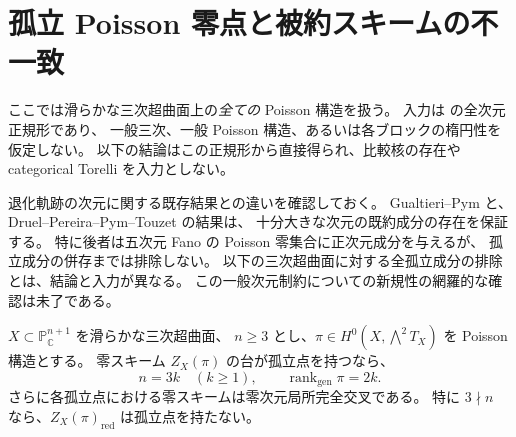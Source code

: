 \section{孤立 Poisson 零点と被約スキームの不一致}
\label{mix:sec:poisson-limits}

ここでは滑らかな三次超曲面上の\emph{全ての} Poisson 構造を扱う。
入力は \cite[定理\texttt{thm:pg-normal}]{NCCubicA} の全次元正規形であり、
一般三次、一般 Poisson 構造、あるいは各ブロックの楕円性を仮定しない。
以下の結論はこの正規形から直接得られ、比較核の存在や
categorical Torelli を入力としない。

退化軌跡の次元に関する既存結果との違いを確認しておく。
Gualtieri--Pym
\cite[Conjecture~1.1, Theorem~7.13]{GualtieriPymDegeneracy}と、
Druel--Pereira--Pym--Touzet
\cite[Theorem~1.2, Corollary~1.3]{DPPTBondalFive}の結果は、
十分大きな次元の既約成分の存在を保証する。
特に後者は五次元 Fano の Poisson 零集合に正次元成分を与えるが、
孤立成分の併存までは排除しない。
以下の三次超曲面に対する全孤立成分の排除とは、結論と入力が異なる。
この一般次元制約についての新規性の網羅的な確認は未了である。

\begin{theorem}
\label{ppz:thm:isolated-zero-dimension}
$X\subset\mathbb P^{n+1}_{\mathbb C}$ を滑らかな三次超曲面、
$n\ge3$ とし、$\pi\in H^0(X,\bigwedge^2T_X)$ を Poisson 構造とする。
零スキーム $Z_X(\pi)$ の台が孤立点を持つなら、
\[
 n=3k\quad(k\ge1),\qquad \operatorname{rank}_{\mathrm{gen}}\pi=2k.
\]
さらに各孤立点における零スキームは零次元局所完全交叉である。
特に $3\nmid n$ なら、$Z_X(\pi)_{\mathrm{red}}$ は孤立点を持たない。
\end{theorem}

